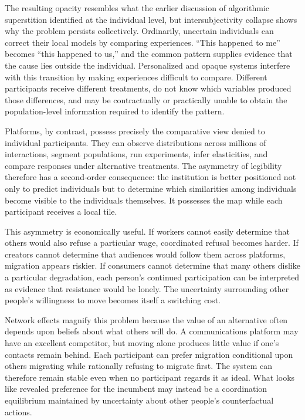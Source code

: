 \documentclass[11pt]{article}
\begin{document}
The resulting opacity resembles what the earlier discussion of algorithmic superstition identified at the individual level, but intersubjectivity collapse shows why the problem persists collectively. Ordinarily, uncertain individuals can correct their local models by comparing experiences. ``This happened to me'' becomes ``this happened to us,'' and the common pattern supplies evidence that the cause lies outside the individual. Personalized and opaque systems interfere with this transition by making experiences difficult to compare. Different participants receive different treatments, do not know which variables produced those differences, and may be contractually or practically unable to obtain the population-level information required to identify the pattern.

Platforms, by contrast, possess precisely the comparative view denied to individual participants. They can observe distributions across millions of interactions, segment populations, run experiments, infer elasticities, and compare responses under alternative treatments. The asymmetry of legibility therefore has a second-order consequence: the institution is better positioned not only to predict individuals but to determine which similarities among individuals become visible to the individuals themselves. It possesses the map while each participant receives a local tile.

This asymmetry is economically useful. If workers cannot easily determine that others would also refuse a particular wage, coordinated refusal becomes harder. If creators cannot determine that audiences would follow them across platforms, migration appears riskier. If consumers cannot determine that many others dislike a particular degradation, each person's continued participation can be interpreted as evidence that resistance would be lonely. The uncertainty surrounding other people's willingness to move becomes itself a switching cost.

Network effects magnify this problem because the value of an alternative often depends upon beliefs about what others will do. A communications platform may have an excellent competitor, but moving alone produces little value if one's contacts remain behind. Each participant can prefer migration conditional upon others migrating while rationally refusing to migrate first. The system can therefore remain stable even when no participant regards it as ideal. What looks like revealed preference for the incumbent may instead be a coordination equilibrium maintained by uncertainty about other people's counterfactual actions.
\end{document}
